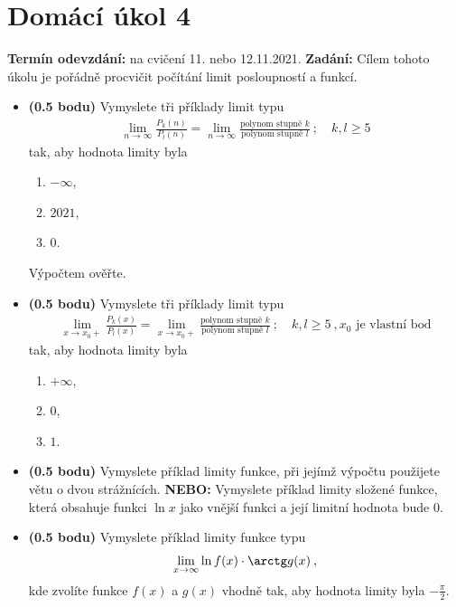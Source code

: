 \section*{Domácí úkol 4}
\textbf{Termín odevzdání:} na cvičení 11. nebo 12.11.2021.
\newline
\textbf{Zadání:} Cílem tohoto úkolu je pořádně procvičit počítání limit posloupností a funkcí.

\begin{itemize}
    \item \textbf{(0.5 bodu)} Vymyslete tři příklady limit typu
    \begin{align}
        \lim_{n \rightarrow \infty} \frac{P_k(n)}{P_l(n)} = \lim_{n \rightarrow \infty} \frac{\text{polynom stupně }k}{\text{polynom stupně }l} \:; \quad k,l \geq 5
    \end{align}
    tak, aby hodnota limity byla
    \begin{enumerate}
        \item $-\infty$,
        \item $2021$,
        \item $0$.
    \end{enumerate}
    Výpočtem ověřte.

    \item \textbf{(0.5 bodu)} Vymyslete tři příklady limit typu
    \begin{align}
        \lim_{x \rightarrow x_0+} \frac{P_k(x)}{P_l(x)} = \lim_{x \rightarrow x_0+} \frac{\text{polynom stupně }k}{\text{polynom stupně }l} \:; \quad k,l \geq 5 \:, x_0 \text{ je vlastní bod}
    \end{align}
    tak, aby hodnota limity byla
    \begin{enumerate}
        \item $+\infty$,
        \item $0$,
        \item $1$.
    \end{enumerate}

    \item \textbf{(0.5 bodu)} Vymyslete příklad limity funkce, při jejímž výpočtu použijete větu o dvou strážnících. \textbf{NEBO:} Vymyslete příklad limity složené funkce, která obsahuje funkci $\ln x$ jako vnější funkci a její limitní hodnota bude $0$.
    
    \item \textbf{(0.5 bodu)} Vymyslete příklad limity funkce typu
    \begin{align}
        \lim_{x \rightarrow \infty} \ln f(x) \cdot \arctg g(x) \:,
    \end{align}
    kde zvolíte funkce $f(x)$ a $g(x)$ vhodně tak, aby hodnota limity byla $-\frac{\pi}{2}$.
\end{itemize}
